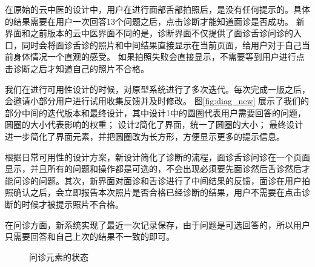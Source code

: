 在原始的云中医的设计中，用户在进行面部舌部拍照后，是没有任何提示的。具体的结果需要在用户一次回答13个问题之后，点击诊断才能知道面诊是否成功。
新界面和之前版本的云中医界面不同的是，诊断界面不仅提供了面诊舌诊问诊的入口，同时会将面诊舌诊的照片和中间结果直接显示在当前页面，给用户对于自己当前身体情况一个直观的感受。
如果拍照失败会直接显示，不需要等到用户进行点击诊断之后才知道自己的照片不合格。
    
我们在进行可用性设计的时候，对原型系统进行了多次迭代。每次完成一版之后，会邀请小部分用户进行试用收集反馈并及时修改。
图\ref{fig:diag_new} 展示了我们的部分中间的迭代版本和最终设计，其中设计1中的圆圈代表用户需要回答的问题，圆圈的大小代表影响的权重；
设计2简化了界面，统一了圆圈的大小；
最终设计进一步简化了界面元素，并把圆圈改为长方形，方便显示更多的提示信息。

根据日常可用性的设计方案，新设计简化了诊断的流程，面诊舌诊问诊在一个页面显示，并且所有的问题和操作都是可选的，不会出现必须要先面诊然后舌诊然后才能问诊的问题。其次，新界面对面诊和舌诊进行了中间结果的反馈，面诊在用户拍照确认之后，会立即报告本次照片是否合格已经诊断的结果，用户不需要在点击诊断的时候才被提示照片不合格。

在问诊方面，新系统实现了最近一次记录保存，由于问题是可选回答的，所以用户只需要回答和自己上次的结果不一致的即可。

\begin{figure}
    \centering
    \caption{问诊元素的状态}
    \label{fig:question_status}
\end{figure}

